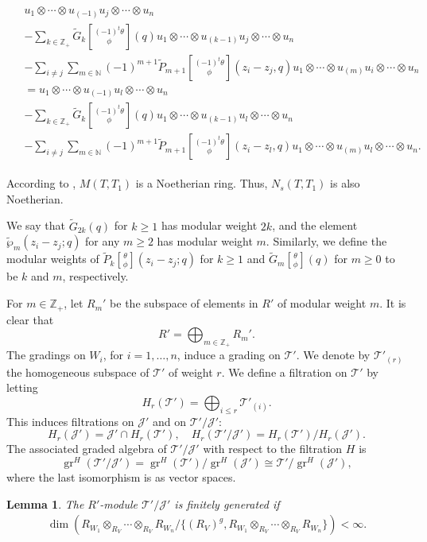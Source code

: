 \documentclass[9pt]{amsart}
\newtheorem{lemma}{Lemma}[section]
\newcommand{\T}{\mathcal{T}}
\newcommand{\J}{\mathcal{J}}
\begin{document}
\begin{itemize}
    \begin{align} \label{108}
    \begin{split}
        & u_1 \otimes \cdots \otimes u_{(-1)}u_j \otimes \cdots \otimes u_n \\
        & - \sum_{k \in \mathbb{Z}_+} \tilde{G}_{k} \genfrac[]{0pt}{0}{(-1)^t \theta}{\phi}(q)
        u_1 \otimes \cdots \otimes u_{(k-1)}u_j \otimes \cdots \otimes u_n \\
        & - \sum_{i \neq j} \sum_{m \in \mathbb{N}} (-1)^{m+1} \tilde{P}_{m+1} \genfrac[]{0pt}{0}{(-1)^t \theta}{\phi}(z_i - z_j, q)
        u_1 \otimes \cdots \otimes u_{(m)}u_i \otimes \cdots \otimes u_n \\
        &= u_1 \otimes \cdots \otimes u_{(-1)}u_l \otimes \cdots \otimes u_n \\
        & - \sum_{k \in \mathbb{Z}_+} \tilde{G}_{k} \genfrac[]{0pt}{0}{(-1)^t \theta}{\phi}(q)
        u_1 \otimes \cdots \otimes u_{(k-1)}u_l \otimes \cdots \otimes u_n \\
        & - \sum_{i \neq j} \sum_{m \in \mathbb{N}} (-1)^{m+1} \tilde{P}_{m+1} \genfrac[]{0pt}{0}{(-1)^t \theta}{\phi}(z_i - z_l, q)
        u_1 \otimes \cdots \otimes u_{(m)}u_l \otimes \cdots \otimes u_n.
    \end{split}
    \end{align}
\end{itemize}
According to \cite{deligne1973schemas}, $M(T, T_1)$ is a Noetherian ring. Thus, $N_s(T,T_1)$ is also Noetherian.

We say that $\tilde{G}_{2k}(q)$ for $k \geq 1$ has modular weight $2k$, and the element $\tilde{\wp}_{m}(z_{i}-z_{j};q)$ for any $m \geq 2$ has modular weight $m$. Similarly, we define the modular weights of $\tilde{P}_{k}\genfrac[]{0pt}{0}{\theta}{\phi}(z_{i}-z_{j};q)$ for $k \geq 1$ and $\tilde{G}_{m}\genfrac[]{0pt}{0}{\theta}{\phi}(q)$ for $m \geq 0$ to be $k$ and $m$, respectively.

For $m \in \mathbb{Z}_+$, let $R_{m}'$ be the subspace of elements in $R'$ of modular weight $m$. It is clear that
\[
R' = \bigoplus_{m \in \mathbb{Z_+}} R_{m}'.
\]
 The gradings on $W_i$, for $i = 1, \dots, n$, induce a grading on $\T'$. We denote by $\T'_{(r)}$ the homogeneous subspace of $\T'$ of weight $r$.
We define a filtration on $\T'$ by letting
\[
H_{r}(\T') = \bigoplus_{i \leq r} \T'_{(i)}.
\]
This induces filtrations on $\J'$ and on $\T'/\J'$:
\[
H_r(\J') = \J' \cap H_r(\T'), \quad H_r(\T'/\J') = H_r(\T') / H_r(\J').
\]
The associated graded algebra of $\T'/\J'$ with respect to the filtration $H$ is
\[
\operatorname{gr}^H(\T'/\J') = \operatorname{gr}^H(\T') / \operatorname{gr}^H(\J') \cong \T' / \operatorname{gr}^{H}(\J'),
\]
where the last isomorphism is as vector spaces.
\begin{lemma}\label{finitgene}
The $R'$-module $\T'/\J'$ is finitely generated if
\begin{align}\label{confinitenesscon}
\dim\left( R_{W_1} \otimes_{R_V} \cdots \otimes_{R_V} R_{W_n} \big/ \{(R_V)^g, R_{W_1} \otimes_{R_V} \cdots \otimes_{R_V} R_{W_n} \} \right) < \infty.
\end{align}
\end{lemma}
\end{document}
